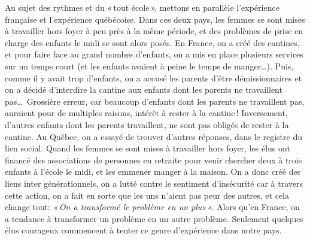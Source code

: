 \documentclass[11pt]{article} %
\begin{document}
  Au sujet des rythmes et du « tout école », mettons en parallèle l'expérience française et l'expérience québécoise. Dans ces deux pays, les femmes se sont mises à travailler hors foyer à peu près à la même période, et des problèmes de prise en charge des enfants le midi se sont alors posés.\newline
  En France, on a créé des cantines, et pour faire face au grand nombre d'enfants, on a mis en place plusieurs services sur un temps court (et les enfants avaient à peine le temps de manger\dots). Puis, comme il y avait trop d'enfants, on a accusé les parents d'être démissionnaires et on a décidé d'interdire la cantine aux enfants dont les parents ne travaillent pas\dots\ Grossière erreur, car beaucoup d'enfants dont les parents ne travaillent pas, auraient pour de multiples raisons, intérêt à rester à la cantine ! Inversement, d'autres enfants dont les parents travaillent, ne sont pas obligés de rester à la cantine.\newline
  Au Québec, on a essayé de trouver d'autres réponses, dans le registre du lien social. Quand les femmes se sont mises à travailler hors foyer, les élus ont financé des associations de personnes en retraite pour venir chercher deux à trois enfants à l'école le midi, et les emmener manger à la maison. On a donc créé des liens inter générationnels, on a lutté contre le sentiment d'insécurité car à travers cette action, on a fait en sorte que les uns n'aient pas peur des autres, et cela change tout: \textit{« On a transformé le problème en un plus »}. Alors qu'en France, on a tendance à transformer un problème en un autre problème. Seulement quelques élus courageux commencent à tenter ce genre d'expérience dans notre pays.
\end{document}
